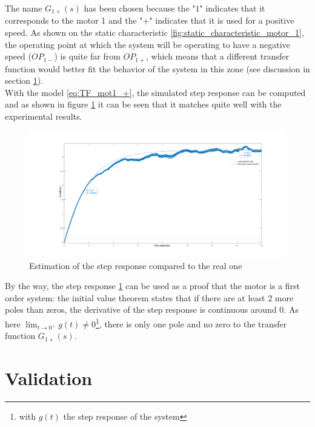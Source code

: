 The name $G_{1+}(s)$ has been chosen because the "\textit{$1$}" indicates that it corresponds to the motor 1 and the 
"\textit{$+$}" indicates that it is used for a positive speed. As shown on the static characteristic 
\ref{fig:static_characteristic_motor_1}, the operating point at which the system will be operating to have a negative speed 
($OP_{1-}$) is quite far from $OP_{1+}$, which means that a different transfer function would better fit the behavior of the system in this zone (see discussion in section \ref{section_validation}).\\

With the model \ref{eq:TF_mot1_+}, the simulated step response can be computed and as shown in figure 
\ref{fig:estimated_step_response_positive_motor_1} it can be seen that it matches quite well with the experimental results.

\begin{figure}[H]
    \centering
    \includegraphics[width=\textwidth]{Pictures/first_order_model_positive_motor_1.png}
    \caption{Estimation of the step response compared to the real one}
    \label{fig:estimated_step_response_positive_motor_1}
\end{figure}

By the way, the step response \ref{fig:estimated_step_response_positive_motor_1} can be used as a proof that the motor
is a first order system: the initial value theorem states that if there are at least 2 more poles than zeros, the 
derivative of the step response is continuous around 0. As here $\lim_{t \rightarrow 0^+} g(t) \neq 0$\footnote{with $g
(t)$ the step response of the system}, there is only one pole and no zero to the transfer function $G_{1+}(s)$.

\section{Validation}
\label{section_validation}

